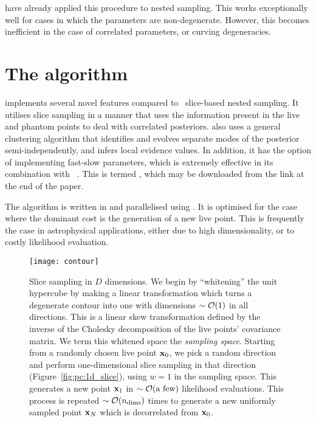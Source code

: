 \cite{SystemsBio} have already applied this procedure to nested sampling. This works exceptionally well for cases in which the parameters are non-degenerate. However, this becomes inefficient in the case of correlated parameters, or curving degeneracies.










\section{The \PolyChord{} algorithm}
\label{sec:pc:polychord_algorithm}

\PolyChord{} implements several novel features compared to~ slice-based nested sampling.  
It utilises slice sampling in a manner that uses the information present in the live and phantom points to deal with correlated posteriors. 
\PolyChord{} also uses a general clustering algorithm that identifies and evolves separate modes of the posterior semi-independently, and infers local evidence values.  
In addition, it has the option of implementing fast-slow parameters, which is extremely effective in its combination with \CosmoMC{}~\citep{cosmomc}. 
This is termed \CosmoChord, which may be downloaded from the link at the end of the paper.

 The algorithm is written in \FORTRAN{} and parallelised using \openMPI{}.  It is optimised for the case where the dominant cost is the generation of a new live point.  This is frequently the case in astrophysical applications, either due to high dimensionality, or to costly likelihood evaluation.  

%
\begin{figure}
  \centerline{%
    \texttt{[image: contour]}
}
\caption{%
  Slice sampling in $D$ dimensions. 
  We begin by ``whitening'' the unit hypercube by making a linear transformation which turns a degenerate contour into one with dimensions ${\sim\mathcal{O}{\left(1\right)}}$ in all directions. 
  This is a linear skew transformation defined by the inverse of the Cholesky decomposition of the live points' covariance matrix. 
  We term this whitened space the {\em sampling space}. 
  Starting from a randomly chosen live point $\mathbf{x}_{0}$, we pick a random direction and perform one-dimensional slice sampling in that direction (Figure~\protect\ref{fig:pc:1d_slice}), using $w=1$ in the sampling space. 
  This generates a new point $\mathbf{x}_{1}$ in ${\sim\mathcal{O}{\left(\text{a few}\right)}}$ likelihood evaluations. 
  This process is repeated ${\sim\mathcal{O}{\left(n_{\mathrm{dims}}\right)}}$ times to generate a new uniformly sampled point $\mathbf{x}_{N}$ which is decorrelated from $\mathbf{x}_{0}$.\label{fig:pc:Nd_slice}
}
\end{figure}
%


